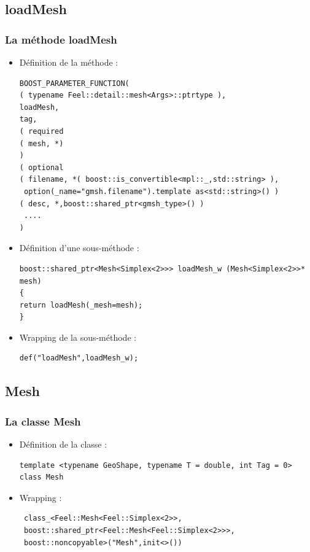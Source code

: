 \documentclass[french,10pt]{beamer}
\begin{document}
\subsection{loadMesh}
\begin{frame}[fragile]
\frametitle{La méthode loadMesh}
\begin{itemize}
\item Définition de la méthode :
\begin{lstlisting}
BOOST_PARAMETER_FUNCTION(
( typename Feel::detail::mesh<Args>::ptrtype ),
loadMesh,
tag,
( required
( mesh, *)
)
( optional
( filename, *( boost::is_convertible<mpl::_,std::string> ),
 option(_name="gmsh.filename").template as<std::string>() )
( desc, *,boost::shared_ptr<gmsh_type>() )
 ....
)
\end{lstlisting}
\item Définition d'une sous-méthode :
\begin{lstlisting}
boost::shared_ptr<Mesh<Simplex<2>>> loadMesh_w (Mesh<Simplex<2>>* mesh)
{
return loadMesh(_mesh=mesh);
}
\end{lstlisting}
\item Wrapping de la sous-méthode :
\begin{lstlisting}
def("loadMesh",loadMesh_w);
\end{lstlisting}
\end{itemize}
\end{frame}

\subsection{Mesh}
\begin{frame}[fragile]
\frametitle{La classe Mesh}
\begin{itemize}
\item Définition de la classe :
\begin{lstlisting}
template <typename GeoShape, typename T = double, int Tag = 0>
class Mesh
\end{lstlisting}
\item Wrapping :
\begin{lstlisting}
 class_<Feel::Mesh<Feel::Simplex<2>>,
 boost::shared_ptr<Feel::Mesh<Feel::Simplex<2>>>,
 boost::noncopyable>("Mesh",init<>())
\end{lstlisting}
\end{itemize}
\end{frame}
\end{document}
